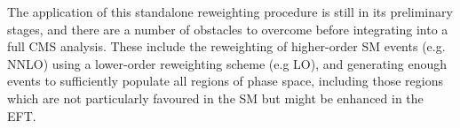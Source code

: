 The application of this standalone reweighting procedure is still in its preliminary stages, and there are a number of obstacles to overcome before integrating into a full CMS analysis. These include the reweighting of higher-order SM events (e.g. NNLO) using a lower-order reweighting scheme (e.g LO), and generating enough events to sufficiently populate all regions of phase space, including those regions which are not particularly favoured in the SM but might be enhanced in the EFT.




